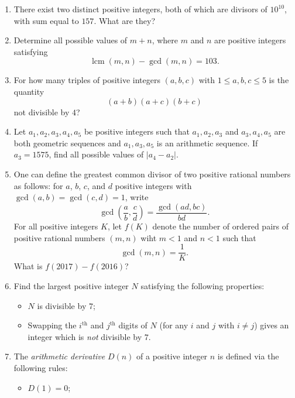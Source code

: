\documentclass[10pt]{article}
\newcommand{\lcm}{\operatorname{lcm}}
\begin{document}
\begin{enumerate}

\item There exist two distinct positive integers, both of which are divisors of $10^{10}$, with sum equal to $157$.  What are they?

\item Determine all possible values of $m+n$, where $m$ and $n$ are positive integers satisfying \[\lcm(m,n) - \gcd(m,n) = 103.\]

\item For how many triples of positive integers $(a,b,c)$ with $1\leq a,b,c\leq 5$ is the quantity \[(a+b)(a+c)(b+c)\] not divisible by $4$?

\item Let $a_1, a_2, a_3, a_4, a_5$ be positive integers such that $a_1, a_2, a_3$ and $a_3, a_4, a_5$ are both geometric sequences and $a_1, a_3, a_5$ is an arithmetic sequence. If $a_3 = 1575$, find all possible values of $\vert a_4 - a_2 \vert$.


\item One can define the greatest common divisor of two positive rational numbers as follows: for $a$, $b$, $c$, and $d$ positive integers with $\gcd(a,b)=\gcd(c,d)=1$, write \[\gcd\left(\dfrac ab,\dfrac cd\right) = \dfrac{\gcd(ad,bc)}{bd}.\] For all positive integers $K$, let $f(K)$ denote the number of ordered pairs of positive rational numbers $(m,n)$ wiht $m<1$ and $n<1$ such that \[\gcd(m,n)=\dfrac{1}{K}.\] What is $f(2017)-f(2016)$?

\item Find the largest positive integer $N$ satisfying the following properties:

\begin{itemize}

\item $N$ is divisible by $7$;

\item Swapping the $i^{\text{th}}$ and $j^{\text{th}}$ digits of $N$ (for any $i$ and $j$ with $i\neq j$) gives an integer which is \textit{not} divisible by $7$.

\end{itemize}

\item The \textit{arithmetic derivative} $D(n)$ of a positive integer $n$ is defined via the following rules:

\begin{itemize}

\item $D(1) = 0$;


\end{itemize}
\end{enumerate}
\end{document}
